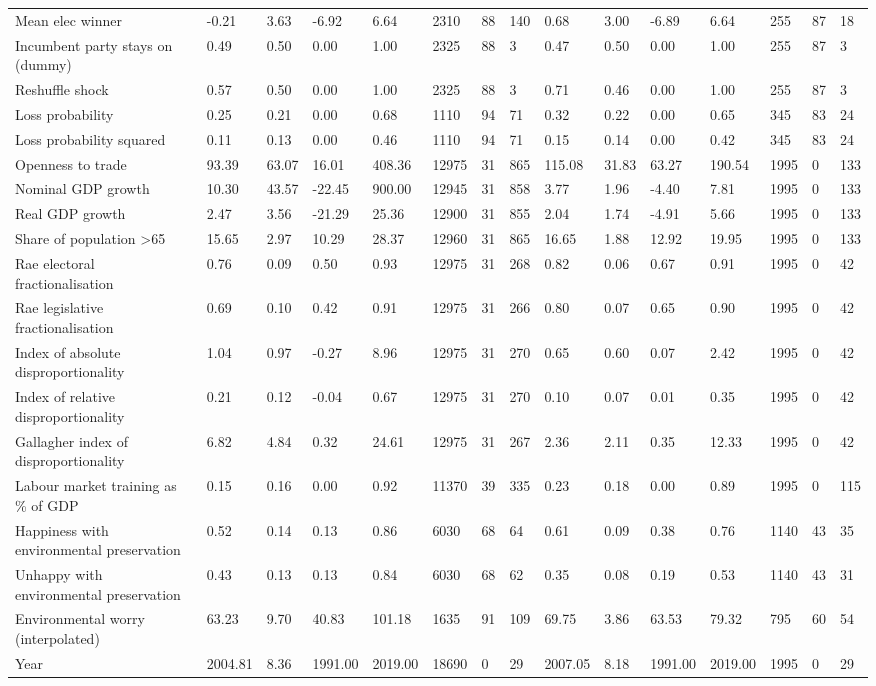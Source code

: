 \begin{longtable}{lllllllllllllll}
Mean elec winner & -0.21 & 3.63 & -6.92 & 6.64 & 2310 & 88 & 140 & 0.68 & 3.00 & -6.89 & 6.64 & 255 & 87 & 18\\
Incumbent party stays on (dummy) & 0.49 & 0.50 & 0.00 & 1.00 & 2325 & 88 & 3 & 0.47 & 0.50 & 0.00 & 1.00 & 255 & 87 & 3\\
\addlinespace
Reshuffle shock & 0.57 & 0.50 & 0.00 & 1.00 & 2325 & 88 & 3 & 0.71 & 0.46 & 0.00 & 1.00 & 255 & 87 & 3\\
Loss probability & 0.25 & 0.21 & 0.00 & 0.68 & 1110 & 94 & 71 & 0.32 & 0.22 & 0.00 & 0.65 & 345 & 83 & 24\\
Loss probability squared & 0.11 & 0.13 & 0.00 & 0.46 & 1110 & 94 & 71 & 0.15 & 0.14 & 0.00 & 0.42 & 345 & 83 & 24\\
Openness to trade & 93.39 & 63.07 & 16.01 & 408.36 & 12975 & 31 & 865 & 115.08 & 31.83 & 63.27 & 190.54 & 1995 & 0 & 133\\
Nominal GDP growth & 10.30 & 43.57 & -22.45 & 900.00 & 12945 & 31 & 858 & 3.77 & 1.96 & -4.40 & 7.81 & 1995 & 0 & 133\\
\addlinespace
Real GDP growth & 2.47 & 3.56 & -21.29 & 25.36 & 12900 & 31 & 855 & 2.04 & 1.74 & -4.91 & 5.66 & 1995 & 0 & 133\\
Share of population >65 & 15.65 & 2.97 & 10.29 & 28.37 & 12960 & 31 & 865 & 16.65 & 1.88 & 12.92 & 19.95 & 1995 & 0 & 133\\
Rae electoral fractionalisation & 0.76 & 0.09 & 0.50 & 0.93 & 12975 & 31 & 268 & 0.82 & 0.06 & 0.67 & 0.91 & 1995 & 0 & 42\\
Rae legislative fractionalisation & 0.69 & 0.10 & 0.42 & 0.91 & 12975 & 31 & 266 & 0.80 & 0.07 & 0.65 & 0.90 & 1995 & 0 & 42\\
Index of absolute disproportionality & 1.04 & 0.97 & -0.27 & 8.96 & 12975 & 31 & 270 & 0.65 & 0.60 & 0.07 & 2.42 & 1995 & 0 & 42\\
\addlinespace
Index of relative disproportionality & 0.21 & 0.12 & -0.04 & 0.67 & 12975 & 31 & 270 & 0.10 & 0.07 & 0.01 & 0.35 & 1995 & 0 & 42\\
Gallagher index of disproportionality & 6.82 & 4.84 & 0.32 & 24.61 & 12975 & 31 & 267 & 2.36 & 2.11 & 0.35 & 12.33 & 1995 & 0 & 42\\
Labour market training as \% of GDP & 0.15 & 0.16 & 0.00 & 0.92 & 11370 & 39 & 335 & 0.23 & 0.18 & 0.00 & 0.89 & 1995 & 0 & 115\\
Happiness with environmental preservation & 0.52 & 0.14 & 0.13 & 0.86 & 6030 & 68 & 64 & 0.61 & 0.09 & 0.38 & 0.76 & 1140 & 43 & 35\\
Unhappy with environmental preservation & 0.43 & 0.13 & 0.13 & 0.84 & 6030 & 68 & 62 & 0.35 & 0.08 & 0.19 & 0.53 & 1140 & 43 & 31\\
\addlinespace
Environmental worry (interpolated) & 63.23 & 9.70 & 40.83 & 101.18 & 1635 & 91 & 109 & 69.75 & 3.86 & 63.53 & 79.32 & 795 & 60 & 54\\
Year & 2004.81 & 8.36 & 1991.00 & 2019.00 & 18690 & 0 & 29 & 2007.05 & 8.18 & 1991.00 & 2019.00 & 1995 & 0 & 29\\
\bottomrule
\end{longtable}
